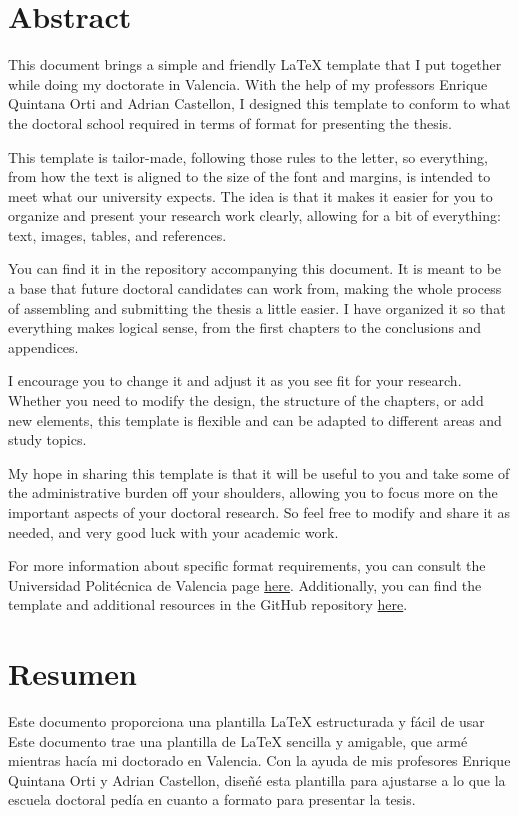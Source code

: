 \chapter*{Abstract}
This document brings a simple and friendly \LaTeX{} template that I put together while doing my doctorate in Valencia. With the help of my professors Enrique Quintana Orti and Adrian Castellon, I designed this template to conform to what the doctoral school required in terms of format for presenting the thesis.

This template is tailor-made, following those rules to the letter, so everything, from how the text is aligned to the size of the font and margins, is intended to meet what our university expects. The idea is that it makes it easier for you to organize and present your research work clearly, allowing for a bit of everything: text, images, tables, and references.

You can find it in the repository accompanying this document. It is meant to be a base that future doctoral candidates can work from, making the whole process of assembling and submitting the thesis a little easier. I have organized it so that everything makes logical sense, from the first chapters to the conclusions and appendices.

I encourage you to change it and adjust it as you see fit for your research. Whether you need to modify the design, the structure of the chapters, or add new elements, this template is flexible and can be adapted to different areas and study topics.

My hope in sharing this template is that it will be useful to you and take some of the administrative burden off your shoulders, allowing you to focus more on the important aspects of your doctoral research. So feel free to modify and share it as needed, and very good luck with your academic work.

For more information about specific format requirements, you can consult the Universidad Politécnica de Valencia page \href{https://www.upv.es/contenidos/DOCINF/info/}{here}. Additionally, you can find the template and additional resources in the GitHub repository \href{https://github.com/crissmath/Thesis_DISCA_template.git}{here}.





\chapter*{Resumen}
Este documento proporciona una plantilla LaTeX estructurada y fácil de usar Este documento trae una plantilla de \LaTeX{} sencilla y amigable, que armé mientras hacía mi doctorado en Valencia. Con la ayuda de mis profesores Enrique Quintana Orti y Adrian Castellon, diseñé esta plantilla para ajustarse a lo que la escuela doctoral pedía en cuanto a formato para presentar la tesis.

